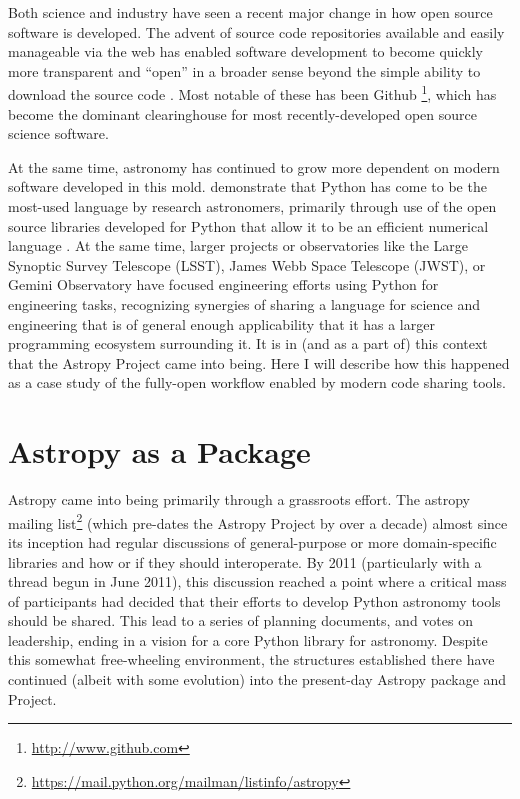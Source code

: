\documentclass[11pt,twoside]{article}
\begin{document}
Both science and industry have seen a recent major change in how open source software is developed.
The advent of source code repositories available and easily manageable via the web has enabled software development to become quickly more transparent and ``open'' in a broader sense beyond the simple ability to download the source code \citep{dabbish12}.
Most notable of these has been Github \footnote{\url{http://www.github.com}}, which has become the dominant clearinghouse for most recently-developed open source science software.

At the same time, astronomy has continued to grow more dependent on modern software developed in this mold.
\citet{momtoll15} demonstrate that Python has come to be the most-used language by research astronomers, primarily through use of the open source libraries developed for Python that allow it to be an efficient numerical language \citep[e.g][]{numpyscipy, matplotlib}.
At the same time, larger projects or observatories like the Large Synoptic Survey Telescope (LSST), James Webb Space Telescope (JWST), or Gemini Observatory have focused engineering efforts using Python for engineering tasks, recognizing synergies of sharing a language for science and engineering that is of general enough applicability that it has a larger programming ecosystem surrounding it.
It is in (and as a part of) this context that the Astropy Project came into being.
Here I will describe how this happened as a case study of the fully-open workflow enabled by modern code sharing tools.

\section{Astropy as a Package}

Astropy \citep{astropy}  came into being primarily through a grassroots effort.
The astropy mailing list\footnote{\url{https://mail.python.org/mailman/listinfo/astropy}} (which pre-dates the Astropy Project by over a decade) almost since its inception had regular discussions of general-purpose or more domain-specific libraries and how or if they should interoperate.
By 2011 (particularly with a thread begun in June 2011), this discussion reached a point where a critical mass of participants had decided that their efforts to develop Python astronomy tools should be shared.
This lead to a series of planning documents, and votes on leadership, ending in a vision for a core Python library for astronomy.
Despite this somewhat free-wheeling environment, the structures established there have continued (albeit with some evolution) into the present-day Astropy package and Project.
\end{document}

